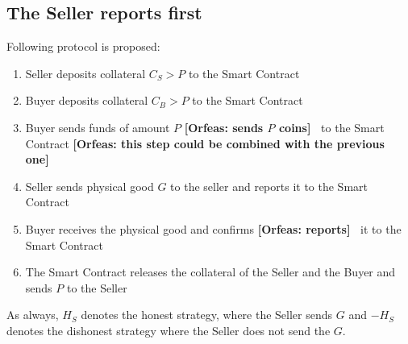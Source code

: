\documentclass{cacthesis}
\newcommand{\authnote}[3]{{ \footnotesize \textbf{#1[#2: #3]~}}}
\newcommand{\orfnote}[1]{\authnote{\color{blue}}{Orfeas}{#1}}
\begin{document}
\subsection{The Seller reports first}
Following protocol is proposed:
\begin{enumerate}
    \item Seller deposits collateral $C_S > P$ to the Smart Contract
    \item Buyer deposits collateral $C_B > P$ to the Smart Contract
    \item Buyer sends funds of amount $P$ \orfnote{sends $P$ coins} to the Smart
    Contract \orfnote{this step could be combined with the previous one}
    \item Seller sends physical good $G$ to the seller and reports it to the Smart Contract
    \item Buyer receives the physical good and confirms \orfnote{reports} it to the Smart Contract
    \item The Smart Contract releases the collateral of the Seller and the Buyer and sends $P$ to the Seller
\end{enumerate}
As always, $H_S$ denotes the honest strategy, where the Seller sends $G$ and $-H_S$ denotes the dishonest strategy where the Seller does not send the $G$.
\end{document}

